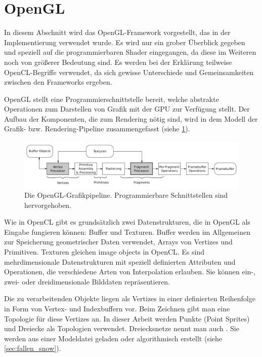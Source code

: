  \section{OpenGL}
\label{sec:opengl}

In diesem Abschnitt wird das OpenGL-Framework vorgestellt, das in der
Implementierung verwendet wurde. Es wird nur ein grober Überblick
gegeben und speziell auf die programmierbaren Shader eingegangen, da
diese im Weiteren noch von größerer Bedeutung sind. Es werden bei der
Erklärung teilweise OpenCL-Begriffe verwendet, da sich gewisse
Unterschiede und Gemeinsamkeiten zwischen den Frameworks ergeben.

OpenGL stellt eine Programmierschnittstelle bereit, welche abstrakte
Operationen zum Darstellen von Grafik mit der GPU zur Verfügung
stellt. Der Aufbau der Komponenten, die zum Rendering nötig sind, wird
in dem Modell der Grafik- bzw. Rendering-Pipeline zusammengefasst
(siehe \cref{fig:opengl_graphics_pipeline}).

\begin{figure}[ht]
\centering
\includegraphics[width=15cm]{images/graphics_pipeline}
\caption{Die OpenGL-Grafikpipeline. Programmierbare Schnittstellen sind hervorgehoben.}
\label{fig:opengl_graphics_pipeline}
\end{figure}

Wie in OpenCL gibt es grundsätzlich zwei Datenstrukturen, die in
OpenGL als Eingabe fungieren können: Buffer und Texturen. Buffer
werden im Allgemeinen zur Speicherung geometrischer Daten verwendet,
\Pimiddydh{} Arrays von Vertizes und Primitiven. Texturen gleichen image
objects in OpenCL\@. Es sind mehrdimensionale Datenstrukturen mit
speziell definierten Attributen und Operationen, die \PimiddyzB{}
verschiedene Arten von Interpolation erlauben. Sie können ein-, zwei-
oder dreidimensionale Bilddaten repräsentieren.

Die zu verarbeitenden Objekte liegen als Vertizes in einer definierten
Reihenfolge in Form von Vertex- und Indexbuffern vor. Beim Zeichnen
gibt man eine Topologie für diese Vertizes an. In dieser Arbeit werden
Punkte (Point Sprites) und Dreiecke als Topologien
verwendet. Dreiecksnetze nennt man auch . Sie
werden \PimiddyzB{} aus einer Modeldatei geladen oder algorithmisch
erstellt (siehe \cref{sec:fallen_snow}).

